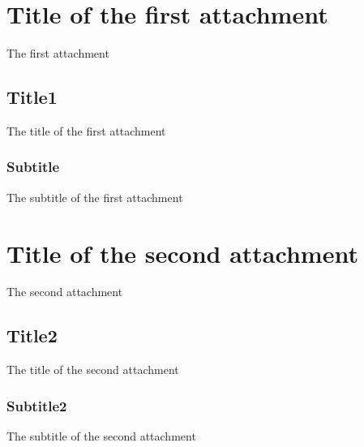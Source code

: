 \chapter{Title of the first attachment}
\label{cha:attach1}
\vspace{0.4 cm} 

The first attachment


\section{Title1}
\label{cha:title1}
\vspace{0.2 cm} 

The title of the first attachment


\vspace{0.1 cm} 
\subsection{Subtitle}
\label{cha:subtitle1}
\vspace{0.1 cm} 

The subtitle of the first attachment


\chapter{Title of the second attachment}
\label{cha:attach2}
\vspace{0.4 cm} 

The second attachment


\section{Title2}
\label{cha:title2}
\vspace{0.2 cm} 

The title of the second attachment


\vspace{0.1 cm} 
\subsection{Subtitle2}
\label{cha:subtitle2}
\vspace{0.1 cm} 

The subtitle of the second attachment
